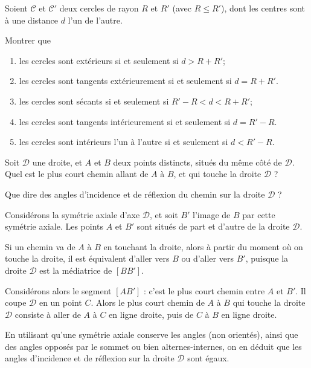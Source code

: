 \begin{exo}
Soient $\mathcal C$ et $\mathcal C'$ deux cercles de rayon $R$ et $R'$ (avec $R\leq R'$), dont les centres sont à une distance $d$ l'un de l'autre.

Montrer que
\begin{enumerate}
\item les cercles sont extérieurs si et seulement si $d > R+R'$;
\item les cercles sont tangents extérieurement si et seulement si $d=R+R'$.
\item les cercles sont sécants si et seulement si $R'-R<d<R+R'$;
\item les cercles sont tangents intérieurement si et seulement si $d=R'-R$.
\item les cercles sont intérieurs l'un à l'autre si et seulement si $d<R'-R$.
\end{enumerate}
\end{exo}


\begin{exo}
\label{riviere}

Soit $\mathcal D$ une droite, et $A$ et $B$ deux points distincts, situés du même côté de $\mathcal D$. Quel est le plus court chemin allant de $A$ à $B$, et qui touche la droite $\mathcal D$ ?

Que dire des angles d'incidence et de réflexion du chemin sur la droite $\mathcal D$ ?

\begin{sol}
Considérons la symétrie axiale d'axe $\mathcal D$, et soit $B'$ l'image de $B$ par cette symétrie axiale.  Les points $A$ et  $B'$ sont situés de part et d'autre de la droite $\mathcal D$.

Si un chemin va de $A$ à $B$ en touchant la droite, alors à partir du moment où on touche la droite, il est équivalent d'aller vers $B$ ou d'aller vers $B'$, puisque la droite $\mathcal D$ est la médiatrice de $[BB']$.


Considérons alors le segment $[AB']$ : c'est le plus court chemin entre $A$ et $B'$. Il coupe $\mathcal D$ en un point $C$. Alors le plus court chemin de $A$ à $B$ qui touche la droite $\mathcal D$ consiste à aller de $A$ à $C$ en ligne droite, puis de $C$ à $B$ en ligne droite.

En utilisant qu'une symétrie axiale conserve les angles (non orientés), ainsi que des angles opposés par le sommet ou bien alternes-internes, on en déduit que les angles d'incidence et de réflexion sur la droite $\mathcal D$ sont égaux.

\end{sol}
\end{exo}


